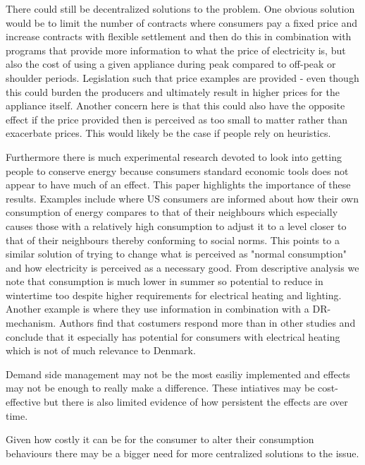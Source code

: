 There could still be decentralized solutions to the problem. One obvious solution would be to limit the number of contracts where consumers pay a fixed price and increase contracts with flexible settlement and then do this in combination with programs that provide more information to what the price of electricity is, but also the cost of using a given appliance during peak compared to off-peak or shoulder periods. Legislation such that price examples are provided - even though this could burden the producers and ultimately result in higher prices for the appliance itself. Another concern here is that this could also have the opposite effect if the price provided then is perceived as too small to matter rather than exacerbate prices. This would likely be the case if people rely on heuristics.
\par

Furthermore there is much experimental research devoted to look into getting people to conserve energy because consumers standard economic tools does not appear to have much of an effect. This paper highlights the importance of these results. Examples include \citep{allcott2011social} where US consumers are informed about how their own consumption of energy compares to that of their neighbours which especially causes those with a relatively high consumption to adjust it to a level closer to that of their neighbours thereby conforming to social norms. This points to a similar solution of trying to change what is perceived as "normal consumption" and how electricity is perceived as a necessary good. From descriptive analysis we note that consumption is much lower in summer so potential to reduce in wintertime too despite higher requirements for electrical heating and lighting. Another example is \citep{saele2011demand} where they use information in combination with a DR-mechanism. Authors find that costumers respond more than in other studies and conclude that it especially has potential for consumers with electrical heating which is not of much relevance to Denmark.
\par

Demand side management may not be the most easiliy implemented and effects may not be enough to really make a difference. These intiatives may be cost-effective but there is also limited evidence of how persistent the effects are over time.

\par %
Given how costly it can be for the consumer to alter their consumption behaviours there may be a bigger need for more centralized solutions to the issue.

